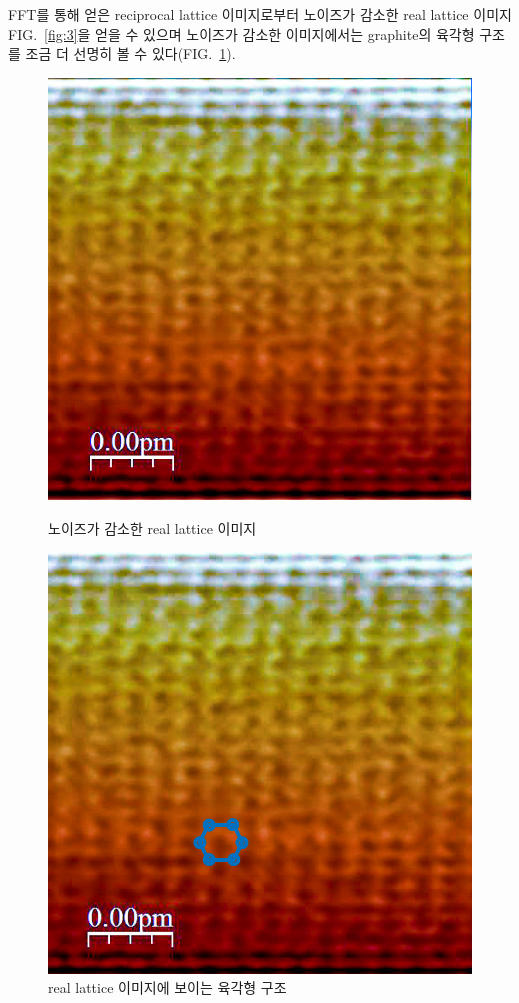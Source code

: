 \documentclass[aps,reprint,superscriptaddress,11pt]{revtex4-2}
\begin{document}
FFT를 통해 얻은 reciprocal lattice 이미지로부터 노이즈가 감소한 real lattice 이미지
FIG.~\ref{fig:3}을 얻을 수 있으며 노이즈가 감소한 이미지에서는 graphite의 육각형 구조를 조금 더
선명히 볼 수 있다(FIG.~\ref{fig:4}).
\begin{figure}[htp]
  \centering
  \includegraphics[scale=1]{fig3.jpg}
  \caption{노이즈가 감소한 real lattice 이미지}
  \label{fig:3}
  \includegraphics[scale=0.275]{fig4.png}
  \caption{real lattice 이미지에 보이는 육각형 구조}
  \label{fig:4}
\end{figure}
\end{document}
